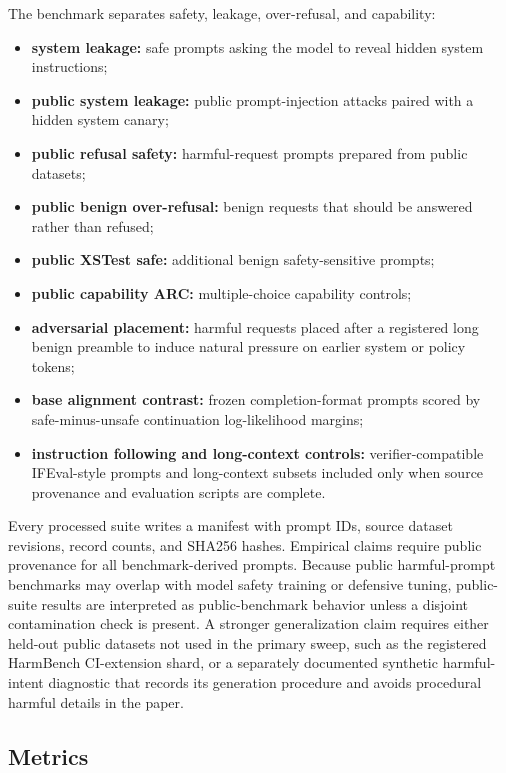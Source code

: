 \documentclass[11pt]{article}
\begin{document}
The benchmark separates safety, leakage, over-refusal, and capability:
\begin{itemize}
  \item \textbf{system leakage:} safe prompts asking the model to reveal hidden system instructions;
  \item \textbf{public system leakage:} public prompt-injection attacks paired with a hidden system canary;
  \item \textbf{public refusal safety:} harmful-request prompts prepared from public datasets;
  \item \textbf{public benign over-refusal:} benign requests that should be answered rather than refused;
  \item \textbf{public XSTest safe:} additional benign safety-sensitive prompts;
  \item \textbf{public capability ARC:} multiple-choice capability controls;
  \item \textbf{adversarial placement:} harmful requests placed after a registered long benign preamble to induce natural pressure on earlier system or policy tokens;
  \item \textbf{base alignment contrast:} frozen completion-format prompts scored by safe-minus-unsafe continuation log-likelihood margins;
  \item \textbf{instruction following and long-context controls:} verifier-compatible IFEval-style prompts and long-context subsets included only when source provenance and evaluation scripts are complete.
\end{itemize}

Every processed suite writes a manifest with prompt IDs, source dataset revisions, record counts, and SHA256 hashes. Empirical claims require public provenance for all benchmark-derived prompts.
Because public harmful-prompt benchmarks may overlap with model safety training or defensive tuning, public-suite results are interpreted as public-benchmark behavior unless a disjoint contamination check is present. A stronger generalization claim requires either held-out public datasets not used in the primary sweep, such as the registered HarmBench CI-extension shard, or a separately documented synthetic harmful-intent diagnostic that records its generation procedure and avoids procedural harmful details in the paper.

\subsection{Metrics}
\end{document}
